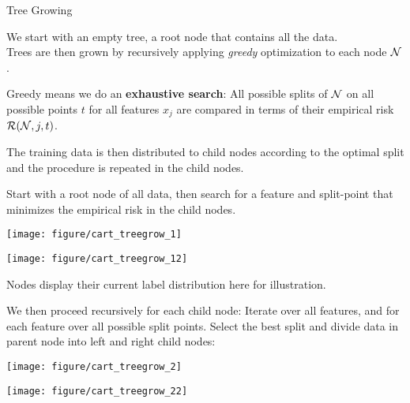 \documentclass[11pt,compress,t,notes=noshow, xcolor=table]{beamer}
\newenvironment{knitrout}{}{} %
\begin{document}
\begin{vbframe}{Tree Growing}

We start with an empty tree, a root node that contains all the data.\\
Trees are then grown by recursively applying \emph{greedy} optimization to each node $\mathcal{N}$.\\
\lz

Greedy means we do an \textbf{exhaustive search}: All possible splits of $\mathcal{N}$ on all possible points $t$ for all features $x_j$ are compared in terms of their empirical risk $\mathcal{R}(\mathcal{N}, j, t)$. 

The training data is then distributed to child nodes according to the optimal split and the procedure is repeated in the child nodes.

\framebreak

Start with a root node of all data, then search for a feature and split-point that minimizes the empirical risk in the child nodes. 
\begin{knitrout}\scriptsize
{}\color{fgcolor}

{\centering \texttt{[image: figure/cart\_treegrow\_1]} 

}




{\centering \texttt{[image: figure/cart\_treegrow\_12]} 

}



\end{knitrout}
Nodes display their current label distribution here for illustration.


\framebreak

We then proceed recursively for each child node:
Iterate over all features, and for each feature over all possible split points. Select the best split and divide data in parent node into left and right child nodes:
\begin{knitrout}\scriptsize
{}\color{fgcolor}

{\centering \texttt{[image: figure/cart\_treegrow\_2]} 

}




{\centering \texttt{[image: figure/cart\_treegrow\_22]} 

}



\end{knitrout}


\end{vbframe}
\end{document}
